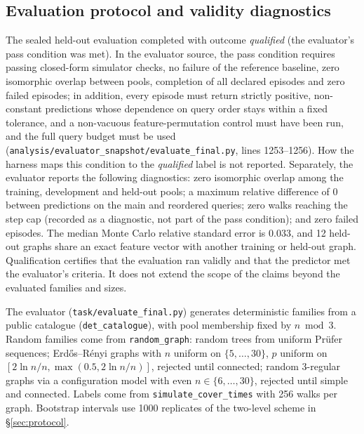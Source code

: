 \documentclass{article}
\begin{document}
\subsection{Evaluation protocol and validity diagnostics}
\label{sec:si_validity}
The sealed held-out evaluation completed with outcome \emph{qualified} (the evaluator's pass condition was met). %
In the evaluator source, the pass condition requires passing closed-form simulator checks, no failure of the reference baseline, zero isomorphic overlap between pools, completion of all declared episodes and zero failed episodes; in addition, every episode must return strictly positive, non-constant predictions whose dependence on query order stays within a fixed tolerance, and a non-vacuous feature-permutation control must have been run, and the full query budget must be used (\texttt{analysis/evaluator\_snapshot/evaluate\_final.py}, lines 1253--1256). How the harness maps this condition to the \emph{qualified} label is not reported. Separately, the evaluator reports the following diagnostics: zero isomorphic overlap among the training, development and held-out pools; a maximum relative difference of 0 between predictions on the main and reordered queries; zero walks reaching the step cap (recorded as a diagnostic, not part of the pass condition); and zero failed episodes. %
The median Monte Carlo relative standard error is 0.033, and 12 held-out graphs share an exact feature vector with another training or held-out graph. Qualification certifies that the evaluation ran validly and that the predictor met the evaluator's criteria. It does not extend the scope of the claims beyond the evaluated families and sizes.

The evaluator (\texttt{task/evaluate\_final.py}) generates deterministic families from a public catalogue (\texttt{det\_catalogue}), with pool membership fixed by $n \bmod 3$. Random families come from \texttt{random\_graph}: random trees from uniform Pr\"ufer sequences; Erd\H{o}s--R\'enyi graphs with $n$ uniform on $\{5,\dots,30\}$, $p$ uniform on $[2\ln n/n, \max(0.5, 2\ln n/n)]$, rejected until connected; random 3-regular graphs via a configuration model with even $n\in\{6,\dots,30\}$, rejected until simple and connected. Labels come from \texttt{simulate\_cover\_times} with 256 walks per graph. Bootstrap intervals use 1000 replicates of the two-level scheme in \S\ref{sec:protocol}. %
\end{document}
